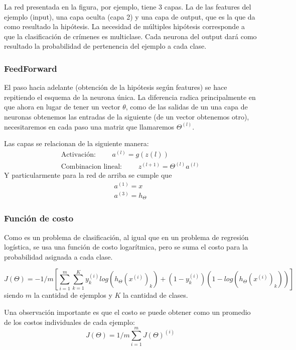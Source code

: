 La red presentada en la figura, por ejemplo, tiene 3 capas. La de las features del ejemplo (input), una capa oculta (capa 2) y una capa de output, que es la que da como resultado la hipótesis. La necesidad de múltiples hipótesis corresponde a que la clasificación de crímenes es multiclase. Cada neurona del output dará como resultado la probabilidad de pertenencia del ejemplo a cada clase.

\subsubsection{FeedForward}
El paso hacia adelante (obtención de la hipótesis según features) se hace repitiendo el esquema de la neurona única. La diferencia radica principalmente en que ahora en lugar de tener un vector $\theta$, como de las salidas de un una capa de neuronas obtenemos las entradas de la siguiente (de un vector obtenemos otro), necesitaremos en cada paso una matriz que llamaremos $\Theta^{(l)}$.

Las capas se relacionan de la siguiente manera:
\begin{eqnarray}
\text{Activación: } \qquad a^{(l)} = g(z(l)) \\
\text{Combinacion lineal: } \qquad z^{(l+1)} = \Theta^{(l)} a^{(l)}
\end{eqnarray}
Y particularmente para la red de arriba se cumple que
\begin{eqnarray}
a^{(1)} = x \\
a^{(3)} = h_{\Theta}
\end{eqnarray}
\subsubsection{Función de costo} Como es un problema de clasificación, al igual que en un problema de regresión logística, se usa una función de costo logarítmica, pero se suma el costo para la probabilidad asignada a cada clase.

\begin{equation}
J(\Theta) = -{1}/{m} \left[ \sum_{i = 1}^{m}\sum_{k = 1}^{K} y_k^{(i)}log(h_\Theta(x^{(i)})_k) + (1-y_k^{(i)})(1-log(h_\Theta(x^{(i)})_k)) \right]
\end{equation}
siendo $m$ la cantidad de ejemplos y $K$ la cantidad de clases.

Una observación importante es que el costo se puede obtener como un promedio de los costos individuales de cada ejemplo:
\begin{equation}
J(\Theta) = 1/m \sum_{i=1}^{m}J(\Theta)^{(i)}
\end{equation}

